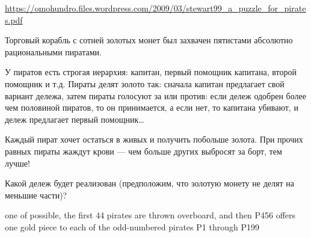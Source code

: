 \begin{problem} \par
\begin{source}
 \url{https://omohundro.files.wordpress.com/2009/03/stewart99_a_puzzle_for_pirates.pdf}
\end{source}
Торговый корабль с сотней золотых монет был захвачен пятистами абсолютно рациональными пиратами.  \par
У пиратов есть строгая иерархия: капитан, первый помощник капитана, второй помощник и т.д. Пираты делят золото так: сначала капитан предлагает свой вариант дележа, затем пираты голосуют за или против: если дележ одобрен более чем половиной пиратов, то он принимается, а если нет, то капитана убивают, и дележ предлагает первый помощник\ldots \par
Каждый пират хочет остаться в живых и получить побольше золота. При прочих равных пираты жаждут крови — чем больше других выбросят за борт, тем лучше! \par
Какой дележ будет реализован (предположим, что золотую монету не делят на меньшие части)?

\begin{sol}

 one of possible, the first 44 pirates are thrown overboard, and then P456 offers
 one gold piece to each of the odd-numbered pirates P1 through P199
\end{sol}
\end{problem}







